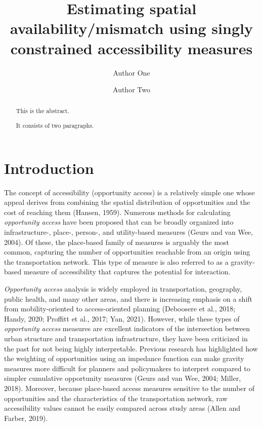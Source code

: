 \documentclass[]{elsarticle} %
\begin{document}
\begin{frontmatter}

  \title{Estimating spatial availability/mismatch using singly
constrained accessibility measures}
    \author[Some School]{Author One}
    \author[Some School]{Author Two}
      \address[Some School]{Address}
  
  \begin{abstract}
  This is the abstract.

  It consists of two paragraphs.
  \end{abstract}
  
 \end{frontmatter}

\newpage

\hypertarget{introduction}{%
\section{Introduction}\label{introduction}}

The concept of accessibility (opportunity access) is a relatively simple
one whose appeal derives from combining the spatial distribution of
opportunities and the cost of reaching them (Hansen, 1959). Numerous
methods for calculating \emph{opportunity access} have been proposed
that can be broadly organized into infrastructure-, place-, person-, and
utility-based measures (Geurs and van Wee, 2004). Of these, the
place-based family of measures is arguably the most common, capturing
the number of opportunities reachable from an origin using the
transportation network. This type of measure is also referred to as a
gravity-based measure of accessibility that captures the potential for
interaction.

\emph{Opportunity access} analysis is widely employed in transportation,
geography, public health, and many other areas, and there is increasing
emphasis on a shift from mobility-oriented to access-oriented planning
(Deboosere et al., 2018; Handy, 2020; Proffitt et al., 2017; Yan, 2021).
However, while these types of \emph{opportunity access} measures are
excellent indicators of the intersection between urban structure and
transportation infrastructure, they have been criticized in the past for
not being highly interpretable. Previous research has highlighted how
the weighting of opportunities using an impedance function can make
gravity measures more difficult for planners and policymakers to
interpret compared to simpler cumulative opportunity measures (Geurs and
van Wee, 2004; Miller, 2018). Moreover, because place-based access
measures sensitive to the number of opportunities and the
characteristics of the transportation network, raw accessibility values
cannot be easily compared across study areas (Allen and Farber, 2019).
\end{document}

